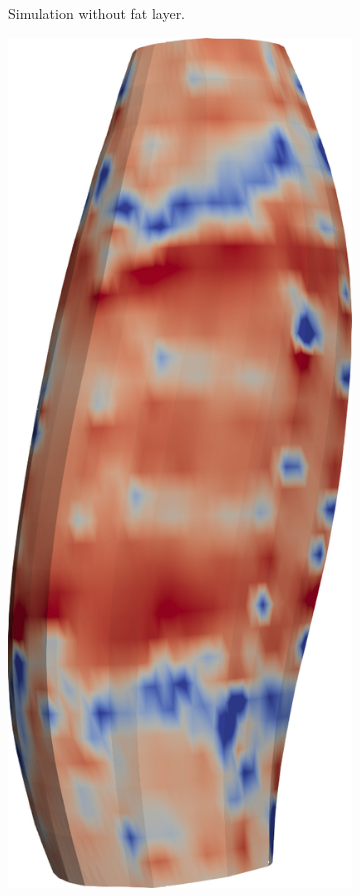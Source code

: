 \begin{figure}[H]
\begin{subfigure}[t]{0.36\textwidth}
    \caption{Simulation without fat layer.}%
    \label{fig:fibers_emg_no_fat}%
  \end{subfigure} \quad
  \begin{subfigure}[t]{0.25\textwidth}%
    \centering%
    \includegraphics[width=\textwidth]{images/results/application/fibers_emg_thin_fat.png}%

\end{subfigure}
\end{figure}
